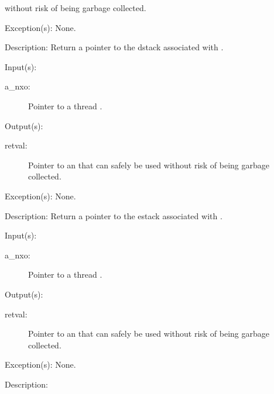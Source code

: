 \begin{capi}
\begin{capilist}
\begin{description}
			without risk of being garbage collected.
		\end{description}
	\item[Exception(s): ] None.
	\item[Description: ]
		Return a pointer to the dstack associated with .
	\end{capilist}
\label{nxo_thread_estack_get}
	\begin{capilist}
	\item[Input(s): ]
		\begin{description}\item[]
		\item[a\_nxo: ]
			Pointer to a thread .
		\end{description}
	\item[Output(s): ]
		\begin{description}\item[]
		\item[retval: ]
			Pointer to an  that can safely be used
			without risk of being garbage collected.
		\end{description}
	\item[Exception(s): ] None.
	\item[Description: ]
		Return a pointer to the estack associated with .
	\end{capilist}
\label{nxo_thread_istack_get}
	\begin{capilist}
	\item[Input(s): ]
		\begin{description}\item[]
		\item[a\_nxo: ]
			Pointer to a thread \classname{nxo}.
		\end{description}
	\item[Output(s): ]
		\begin{description}\item[]
		\item[retval: ]
			Pointer to an  that can safely be used
			without risk of being garbage collected.
		\end{description}
	\item[Exception(s): ] None.
	\item[Description: ]

\end{capilist}
\end{capi}
